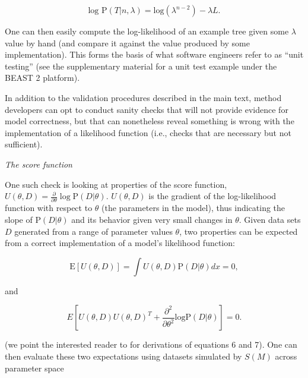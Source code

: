 \documentclass[oneside]{article}
\begin{document}
\begin{equation}
\text{log P}(T|n,\lambda) = \text{log}(\lambda^{n-2}) - \lambda L.
\end{equation}

\noindent One can then easily compute the log-likelihood of an example
tree given some $\lambda$ value by hand (and
compare it against the value produced by some implementation).
This forms the basis of what software engineers refer to as ``unit
testing'' (see the supplementary material for a unit test example
under the BEAST 2 platform).

\begin{tcolorbox}[breakable, width=12cm, colback=gray!10, boxrule=0pt,
  break at=11cm/0cm, title=Box 2: Additional validation sanity-checks, fonttitle=\bfseries]
  \small

  In addition to the validation procedures described in the main text, method developers can opt to conduct sanity checks that will not provide evidence for model correctness, but that can nonetheless reveal something is wrong with the implementation of a likelihood function (i.e., checks that are necessary but not sufficient).

  \vspace{.25cm}
  \emph{The score function}
  
  One such check is looking at properties of the score function, $U(\theta,D)=\frac{\partial}{\partial\theta}\log \text{P}(D|\theta)$. $U(\theta,D)$ is the gradient of the log-likelihood function with respect to $\theta$ (the parameters in the model), thus indicating the slope of $\text{P}(D|\theta)$ and its behavior given very small changes in $\theta$.
  Given data sets $D$ generated from a range of parameter values $\theta$, two properties can be expected from a correct implementation of a model's likelihood function:

  \begin{equation}\label{eq:scorefunction}
    \text{E}[U(\theta,D)] = \int U(\theta,D)\text{P}(D|\theta)dx = 0,
  \end{equation}
  
  and

  \begin{equation}\label{eq:variancestatistic}
    E\left[U(\theta,D)U(\theta,D)^T + \frac{\partial^2}{\partial\theta^2}\text{log} \text{P}(D|\theta)\right]=0.
  \end{equation}

  (we point the interested reader to {\color{red}{NON-WIKIPEDIA CITATIONS HERE}} for derivations of equations 6 and 7).
  One can then evaluate these two expectations using datasets simulated by $S(M)$ across parameter space {\color{red}{MORE ON THIS...}}
\end{tcolorbox}
\end{document}
